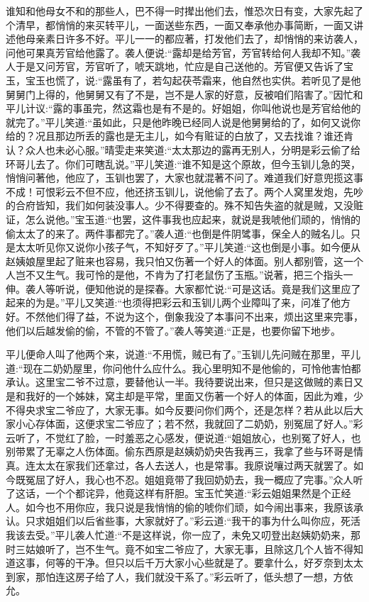 \begin{parag}
    谁知和他母女不和的那些人，巴不得一时撵出他们去，惟恐次日有变，大家先起了个清早，都悄悄的来买转平儿，一面送些东西，一面又奉承他办事简断，一面又讲述他母亲素日许多不好。平儿一一的都应著，打发他们去了，却悄悄的来访袭人，问他可果真芳官给他露了。袭人便说:“露却是给芳官，芳官转给何人我却不知。”袭人于是又问芳官，芳官听了，唬天跳地，忙应是自己送他的。芳官便又告诉了宝玉，宝玉也慌了，说:“露虽有了，若勾起茯苓霜来，他自然也实供。若听见了是他舅舅门上得的，他舅舅又有了不是，岂不是人家的好意，反被咱们陷害了。”因忙和平儿计议:“露的事虽完，然这霜也是有不是的。好姐姐，你叫他说也是芳官给他的就完了。”平儿笑道:“虽如此，只是他昨晚已经同人说是他舅舅给的了，如何又说你给的？况且那边所丢的露也是无主儿，如今有赃证的白放了，又去找谁？谁还肯认？众人也未必心服。”晴雯走来笑道:“太太那边的露再无别人，分明是彩云偷了给环哥儿去了。你们可瞎乱说。”平儿笑道:“谁不知是这个原故，但今玉钏儿急的哭，悄悄问著他，他应了，玉钏也罢了，大家也就混著不问了。难道我们好意兜揽这事不成！可恨彩云不但不应，他还挤玉钏儿，说他偷了去了。两个人窝里发炮，先吵的合府皆知，我们如何装没事人。少不得要查的。殊不知告失盗的就是贼，又没赃证，怎么说他。”宝玉道:“也罢，这件事我也应起来，就说是我唬他们顽的，悄悄的偷太太了的来了。两件事都完了。”袭人道:“也倒是件阴骘事，保全人的贼名儿。只是太太听见你又说你小孩子气，不知好歹了。”平儿笑道:“这也倒是小事。如今便从赵姨娘屋里起了赃来也容易，我只怕又伤著一个好人的体面。别人都别管，这一个人岂不又生气。我可怜的是他，不肯为了打老鼠伤了玉瓶。”说著，把三个指头一伸。袭人等听说，便知他说的是探春。大家都忙说:“可是这话。竟是我们这里应了起来的为是。”平儿又笑道:“也须得把彩云和玉钏儿两个业障叫了来，问准了他方好。不然他们得了益，不说为这个，倒象我没了本事问不出来，烦出这里来完事，他们以后越发偷的偷，不管的不管了。”袭人等笑道:“正是，也要你留下地步。
\end{parag}


\begin{parag}
    平儿便命人叫了他两个来，说道:“不用慌，贼已有了。”玉钏儿先问贼在那里，平儿道:“现在二奶奶屋里，你问他什么应什么。我心里明知不是他偷的，可怜他害怕都承认。这里宝二爷不过意，要替他认一半。我待要说出来，但只是这做贼的素日又是和我好的一个姊妹，窝主却是平常，里面又伤著一个好人的体面，因此为难，少不得央求宝二爷应了，大家无事。如今反要问你们两个，还是怎样？若从此以后大家小心存体面，这便求宝二爷应了；若不然，我就回了二奶奶，别冤屈了好人。”彩云听了，不觉红了脸，一时羞恶之心感发，便说道:“姐姐放心，也别冤了好人，也别带累了无辜之人伤体面。偷东西原是赵姨奶奶央告我再三，我拿了些与环哥是情真。连太太在家我们还拿过，各人去送人，也是常事。我原说嚷过两天就罢了。如今既冤屈了好人，我心也不忍。姐姐竟带了我回奶奶去，我一概应了完事。”众人听了这话，一个个都诧异，他竟这样有肝胆。宝玉忙笑道:“彩云姐姐果然是个正经人。如今也不用你应，我只说是我悄悄的偷的唬你们顽，如今闹出事来，我原该承认。只求姐姐们以后省些事，大家就好了。”彩云道:“我干的事为什么叫你应，死活我该去受。”平儿袭人忙道:“不是这样说，你一应了，未免又叨登出赵姨奶奶来，那时三姑娘听了，岂不生气。竟不如宝二爷应了，大家无事，且除这几个人皆不得知道这事，何等的干净。但只以后千万大家小心些就是了。要拿什么，好歹奈到太太到家，那怕连这房子给了人，我们就没干系了。”彩云听了，低头想了一想，方依允。
\end{parag}


